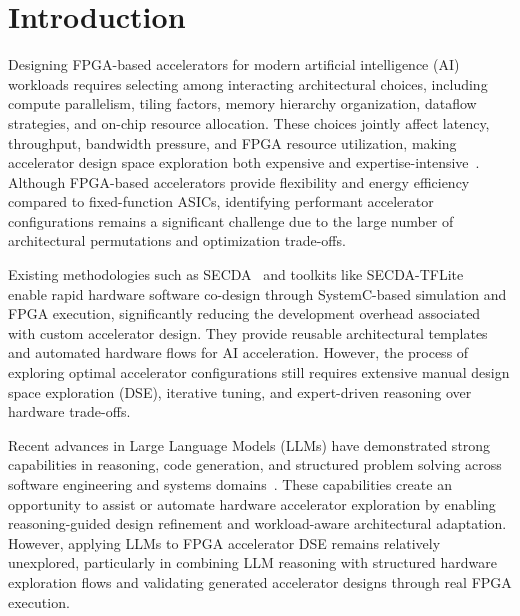 
\section{Introduction}
\label{intro}


Designing FPGA-based accelerators for modern artificial intelligence (AI) workloads requires selecting among interacting architectural choices, including compute parallelism, tiling factors, memory hierarchy organization, dataflow strategies, and on-chip resource allocation. These choices jointly affect latency, throughput, bandwidth pressure, and FPGA resource utilization, making accelerator design space exploration both expensive and expertise-intensive~\cite{mohaidat2024survey}. 
Although FPGA-based accelerators provide flexibility and energy efficiency compared to fixed-function ASICs, identifying performant accelerator configurations remains a significant challenge due to the large number of architectural permutations and optimization trade-offs.

Existing methodologies such as SECDA~\cite{haris2021secda} and toolkits like SECDA-TFLite~\cite{haris2023secda} enable rapid hardware software co-design through SystemC-based simulation and FPGA execution, significantly reducing the development overhead associated with custom accelerator design. They provide reusable architectural templates and automated hardware flows for AI acceleration. However, the process of exploring optimal accelerator configurations still requires extensive manual design space exploration (DSE), iterative tuning, and expert-driven reasoning over hardware trade-offs.

Recent advances in Large Language Models (LLMs) have demonstrated strong capabilities in reasoning, code generation, and structured problem solving across software engineering and systems domains~\cite{hou2024large, fan2023large}. These capabilities create an opportunity to assist or automate hardware accelerator exploration by enabling reasoning-guided design refinement and workload-aware architectural adaptation. However, applying LLMs to FPGA accelerator DSE remains relatively unexplored, particularly in combining LLM reasoning with structured hardware exploration flows and validating generated accelerator designs through real FPGA execution.

